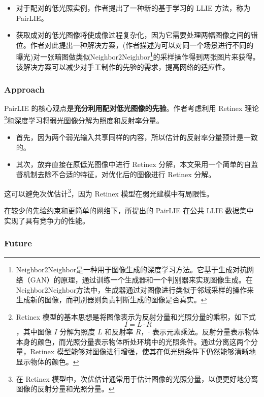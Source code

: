 \documentclass[letterpaper,10pt]{article}
\begin{document}
			\begin{itemize}
				\item [(1)]
				对于配对的低光照实例，作者提出了一种新的基于学习的 LLIE 方法，称为 PairLIE。
				\item [(2)]
				获取成对的低光图像将使成像过程复杂化，因为它需要处理两幅图像之间的错位。作者对此提出一种解决方案，(作者描述为可以对同一个场景进行不同的曝光)对一张暗图做类似Neighbor2Neighbor\footnote{Neighbor2Neighbor是一种用于图像生成的深度学习方法。它基于生成对抗网络（GAN）的原理，通过训练一个生成器和一个判别器来实现图像生成。在Neighbor2Neighbor方法中，生成器通过对图像进行类似于邻域采样的操作来生成新的图像，而判别器则负责判断生成的图像是否真实。}的采样操作得到两张图片来获得。该解决方案可以减少对手工制作的先验的需求，提高网络的适应性。
			\end{itemize}
	
			\subsubsection{Approach}
			
			PairLIE 的核心观点是\textbf{充分利用配对低光图像的先验}。作者考虑利用 Retinex 理论\footnote{Retinex 模型的基本思想是将图像表示为反射分量和光照分量的乘积，如下式$$I = L \cdot R$$，其中图像 $I$ 分解为照度 $L$ 和反射率 $R$，$\cdot$ 表示元素乘法。反射分量表示物体本身的颜色，而光照分量表示物体所处环境中的光照条件。通过分离这两个分量，Retinex 模型能够对图像进行增强，使其在低光照条件下仍然能够清晰地显示物体的颜色。}和深度学习将弱光图像分解为照度和反射率分量。
			
			\begin{itemize}
				\item [(1)]
				首先，因为两个弱光输入共享同样的内容，所以估计的反射率分量预计是一致的。
				\item [(2)]
				其次，放弃直接在原低光图像中进行 Retinex 分解，本文采用一个简单的自监督机制去除不合适的特征，对优化后的图像进行 Retinex 分解。
			\end{itemize}
					
			这可以避免次优估计\footnote{在 Retinex 模型中，次优估计通常用于估计图像的光照分量，以便更好地分离图像的反射分量和光照分量。}，因为 Retinex 模型在弱光建模中有局限性。
			
			在较少的先验约束和更简单的网络下，所提出的 PairLIE 在公共 LLIE 数据集中实现了具有竞争力的性能。
		
			\subsubsection{Future}
			
\end{document}
